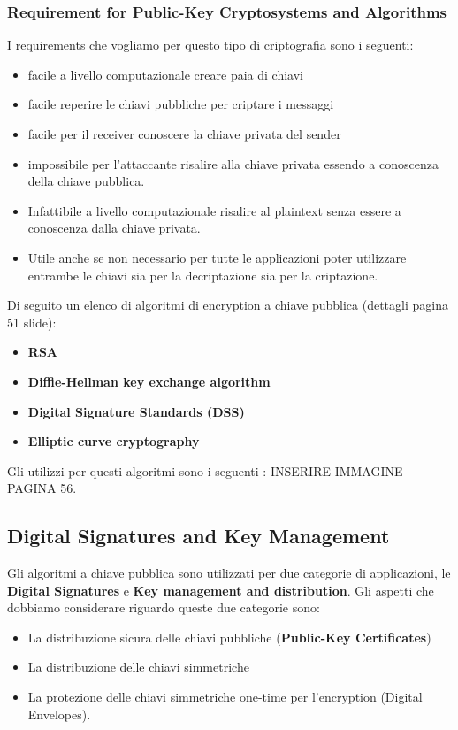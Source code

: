 \documentclass[12pt]{article}
\begin{document}
		\subsubsection{Requirement for Public-Key Cryptosystems and Algorithms}
			I requirements che vogliamo per questo tipo di criptografia sono i seguenti:
			\begin{itemize}
				\item facile a livello computazionale creare paia di chiavi
				\item facile reperire le chiavi pubbliche per criptare i messaggi
				\item facile per il receiver conoscere la chiave privata del sender
				\item impossibile per l'attaccante risalire alla chiave privata essendo a conoscenza della chiave pubblica.
				\item Infattibile a livello computazionale risalire al plaintext senza essere a conoscenza dalla chiave privata.
				\item Utile anche se non necessario per tutte le applicazioni poter utilizzare entrambe le chiavi sia per la decriptazione sia per la criptazione.
			\end{itemize}
			Di seguito un elenco di algoritmi di encryption a chiave pubblica (dettagli pagina 51 slide):
			\begin{itemize}
				\item \textbf{RSA}
				\item \textbf{Diffie-Hellman key exchange algorithm}
				\item \textbf{Digital Signature Standards (DSS)}
				\item \textbf{Elliptic curve cryptography}
			\end{itemize}
		Gli utilizzi per questi algoritmi sono i seguenti : INSERIRE IMMAGINE PAGINA 56.\\
	\subsection{Digital Signatures and Key Management}
		Gli algoritmi a chiave pubblica sono utilizzati per due categorie di applicazioni, le \textbf{Digital Signatures} e \textbf{Key management and distribution}. Gli aspetti che dobbiamo considerare riguardo queste due categorie sono:
		\begin{itemize}
			\item La distribuzione sicura delle chiavi pubbliche (\textbf{Public-Key Certificates})
			\item La distribuzione delle chiavi simmetriche 
			\item La protezione delle chiavi simmetriche one-time per l'encryption (Digital Envelopes).
		\end{itemize}
\end{document}
